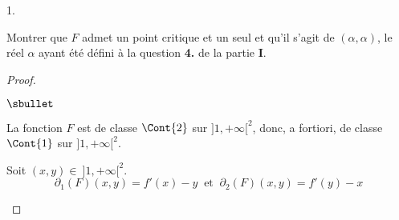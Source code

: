 \begin{noliste}{1.}
\setlength{\itemsep}{2mm}
\setcounter{enumi}{12}
\item Montrer que $F$ admet un point critique et un seul et qu'il 
s'agit 
de $(\alpha,\alpha)$, le réel $\alpha$ ayant été défini à la question 
{\bf 4.} de la partie {\bf I}.

\begin{proof}~
\begin{noliste}{$\sbullet$}
\item La fonction $F$ est de classe $\Cont{2}$ sur $]1,+\infty[^2$, 
donc, a fortiori, de classe $\Cont{1}$ sur $]1,+\infty[^2$.

\item Soit $(x,y)\in \ ]1,+\infty[^2$.
\[
\partial_1(F)(x,y)=f'(x)-y \ \mbox{ et } \ \partial_2(F)(x,y)=f'(y)-x
\]


\end{noliste}
\end{proof}
\end{noliste}
